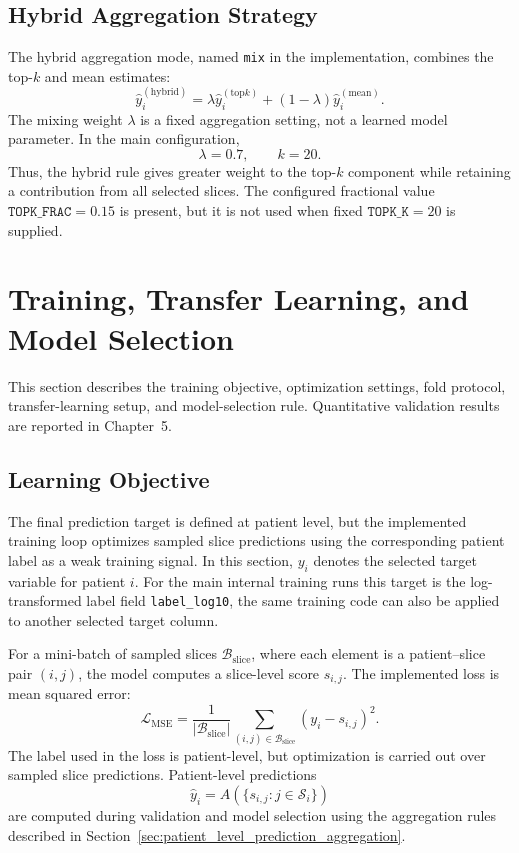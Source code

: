 \subsection{Hybrid Aggregation Strategy}
\label{sec:hybrid_aggregation_strategy}

The hybrid aggregation mode, named \texttt{mix} in the implementation, combines the top-\(k\) and mean estimates:
\[
\hat{y}_i^{(\mathrm{hybrid})}
=
\lambda
\hat{y}_i^{(\mathrm{top}k)}
+
(1-\lambda)
\hat{y}_i^{(\mathrm{mean})}.
\]
The mixing weight \(\lambda\) is a fixed aggregation setting, not a learned model parameter. In the main configuration,
\[
\lambda = 0.7,
\qquad
k = 20.
\]
Thus, the hybrid rule gives greater weight to the top-\(k\) component while retaining a contribution from all selected slices. The configured fractional value \(\texttt{TOPK\_FRAC}=0.15\) is present, but it is not used when fixed \(\texttt{TOPK\_K}=20\) is supplied.


\section{Training, Transfer Learning, and Model Selection}
\label{sec:training_transfer_model_selection}

This section describes the training objective, optimization settings, fold protocol, transfer-learning setup, and model-selection rule. Quantitative validation results are reported in Chapter~5.

\subsection{Learning Objective}
\label{sec:learning_objective}

The final prediction target is defined at patient level, but the implemented training loop optimizes sampled slice predictions using the corresponding patient label as a weak training signal. In this section, \(y_i\) denotes the selected target variable for patient \(i\). For the main internal training runs this target is the log-transformed label field \texttt{label\_log10}, the same training code can also be applied to another selected target column.

For a mini-batch of sampled slices \(\mathcal{B}_{\mathrm{slice}}\), where each element is a patient--slice pair \((i,j)\), the model computes a slice-level score \(s_{i,j}\). The implemented loss is mean squared error:
\begin{equation}
\mathcal{L}_{\mathrm{MSE}}
=
\frac{1}{|\mathcal{B}_{\mathrm{slice}}|}
\sum_{(i,j)\in\mathcal{B}_{\mathrm{slice}}}
\left(y_i - s_{i,j}\right)^2 .
\label{eq:method_mse_slice_training}
\end{equation}
The label used in the loss is patient-level, but optimization is carried out over sampled slice predictions. Patient-level predictions
\[
\hat{y}_i =
A\left(\{s_{i,j}:j\in\mathcal{S}_i\}\right)
\]
are computed during validation and model selection using the aggregation rules described in Section~\ref{sec:patient_level_prediction_aggregation}.



